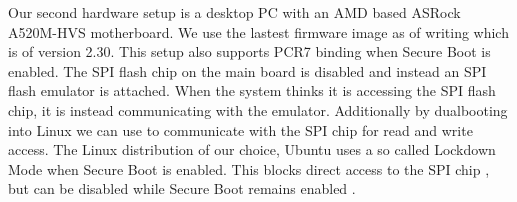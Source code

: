 Our second hardware setup is a desktop \ac{PC} with an \ac{AMD} based ASRock A520M-HVS motherboard.
We use the lastest firmware image as of writing which is of version 2.30.
This setup also supports \ac{PCR}7 binding when Secure Boot is enabled.
The \ac{SPI} flash chip on the main board is disabled and instead an  \ac{SPI} flash emulator is attached.
When the system thinks it is accessing the \ac{SPI} flash chip, it is instead communicating with the emulator.
Additionally by dualbooting into Linux we can use  to communicate with the \ac{SPI} chip for read and write access.
The Linux distribution of our choice, Ubuntu uses a so called Lockdown Mode when Secure Boot is enabled.
This blocks direct access to the \ac{SPI} chip \cite{man-kernel-lockdown}, but can be disabled while Secure Boot remains enabled \cite{disable-kernel-lockdown}.
